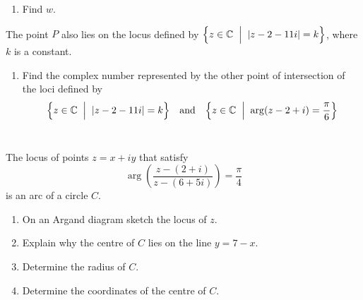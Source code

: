 \documentclass[leqno]{article}
\begin{document}
\begin{enumerate}[
  label=\textbf{\arabic*.},
  leftmargin=*,
  topsep=0pt,
  partopsep=0pt,
  parsep=0pt
]
\begin{enumerate}[label=\textbf{(\alph*)}]
  \item Find $w$.  \\
\end{enumerate}

The point $P$ also lies on the locus defined by $\Bigl\{ z\in\mathbb{C}\;\Bigm|\; \lvert z-2-11i\rvert =k \Bigr\}$, where $k$ is a constant. \\

\begin{enumerate}[label=\textbf{(\alph*)}, resume]
  \item Find the complex number represented by the other point of intersection of the loci defined by \[\Bigl\{ z\in\mathbb{C}\;\Bigm|\; \lvert z-2-11i\rvert =k \Bigr\}\quad\text{and}\quad\Bigl\{ z\in\mathbb{C}\;\Bigm|\; \arg(z-2+i)=\frac{\pi}{6} \Bigr\}\]  \\
\end{enumerate}

\newpage

\questionitem

The locus of points $z=x+iy$ that satisfy
\[
\arg\left(\frac{z-(2+i)}{z-(6+5i)}\right)=\frac{\pi}{4}
\]
is an arc of a circle $C$. \\

\begin{enumerate}[label=\textbf{(\alph*)}]
  \item On an Argand diagram sketch the locus of $z$.  \\
  \item Explain why the centre of $C$ lies on the line $y=7-x$.  \\
  \item Determine the radius of $C$.  \\
  \item Determine the coordinates of the centre of $C$.  \\
\end{enumerate}
\end{enumerate}
\end{document}
